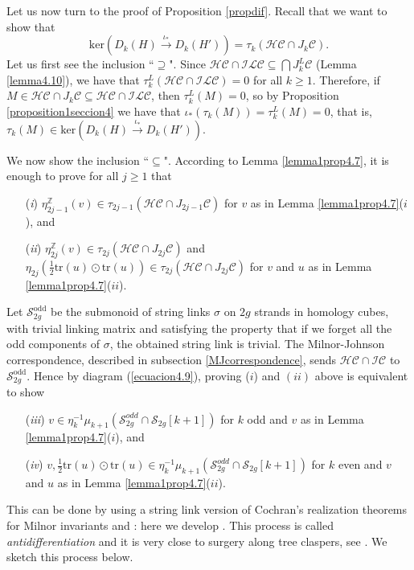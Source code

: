 \documentclass[10pt]{amsart}
\numberwithin{equation}{section}
\numberwithin{equation}{section}
\theoremstyle{definition}
\begin{document}
Let us now turn  to the  proof of Proposition \ref{propdif}. Recall that we want to show that 
 $$\text{ker}(D_k(H)\stackrel{\iota_*}{\rightarrow} D_k(H'))=\tau_k(\mathcal{HC}\cap J_k\mathcal{C}).$$
 Let us first see the inclusion  ``$\supseteq$". Since $\mathcal{HC}\cap \mathcal{ILC}\subseteq \bigcap J_k^L\mathcal{C}$ (Lemma \ref{lemma4.10}), we have  that  $\tau_k^L(\mathcal{HC}\cap\mathcal{ILC})=0$ for all $k\geq 1$. Therefore, if $M\in\mathcal{HC}\cap J_k\mathcal{C}\subseteq \mathcal{HC}\cap\mathcal{ILC}$, then $\tau_k^L(M)=0$, so by Proposition \ref{proposition1seccion4} we have that $\iota_*(\tau_k(M))=\tau_k^L(M)=0$, that is, $\tau_k(M)\in\text{ker}(D_k(H)\stackrel{\iota_*}{\rightarrow} D_k(H'))$.

\noindent  We now show the inclusion ``$\subseteq$". According to Lemma \ref{lemma1prop4.7}, it is enough to prove for all $j\geq 1$ that
\begin{enumerate}
\item[(\emph{i})] $\eta^{\mathbb{Z}}_{2j-1}(v)\in\tau_{2j-1}(\mathcal{HC}\cap J_{2j-1}\mathcal{C})$ for $v$ as in Lemma \ref{lemma1prop4.7}($i$), and
\item[(\emph{ii})] $\eta^{\mathbb{Z}}_{2j}(v)\in\tau_{2j}(\mathcal{HC}\cap J_{2j}\mathcal{C})$ and $\eta_{2j}(\frac{1}{2}\text{tr}(u)\odot \text{tr}(u))\in\tau_{2j}(\mathcal{HC}\cap J_{2j}\mathcal{C})$ for $v$ and $u$ as in Lemma \ref{lemma1prop4.7}($ii$).
\end{enumerate}
Let $\mathcal{S}^{\text{odd}}_{2g}$ be the submonoid of string links $\sigma$ on $2g$ strands  in homology cubes,   with trivial linking matrix and satisfying the property that if we forget all the  odd components of $\sigma$, the obtained string link is  trivial. The Milnor-Johnson correspondence, described in subsection \ref{MJcorrespondence}, sends $\mathcal{HC}\cap\mathcal{IC}$ to $\mathcal{S}^{\text{odd}}_{2g}$. Hence by diagram (\ref{ecuacion4.9}),  proving ($i$) and $(ii)$ above is equivalent to show
\begin{enumerate}
\item[(\emph{iii})] $v\in\eta_k^{-1}\mu_{k+1}(\mathcal{S}^{odd}_{2g}\cap \mathcal{S}_{2g}[k+1])$ for  $k$ odd and  $v$ as in Lemma \ref{lemma1prop4.7}($i$), and 
\item[(\emph{iv})] $v,\frac{1}{2}\text{tr}(u)\odot \text{tr}(u)\in\eta_k^{-1}\mu_{k+1}(\mathcal{S}^{odd}_{2g}\cap \mathcal{S}_{2g}[k+1])$ for $k$ even and $v$ and $u$ as in Lemma \ref{lemma1prop4.7}($ii$).
\end{enumerate}
This can be done by using  a string link version of Cochran's realization theorems for Milnor invariants \cite[Theorem 7.2]{MR1042041} and \cite[Theorem 3.3]{MR1055569}: here we develop  \cite[Remark 8.2]{MR1783857}. This process is called \emph{antidifferentiation} and it is very close to surgery along tree claspers, see \cite[Section 7]{MR1735632}.  We sketch this process below.
\end{document}

